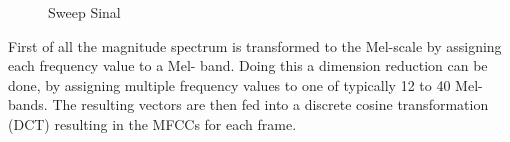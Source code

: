 \begin{figure}[htbp]
	\centering
	\caption{Sweep Sinal}	
	\label{sweep}
\end{figure}
\FloatBarrier

First of all the magnitude spectrum is transformed to the Mel-scale by assigning each frequency value to a Mel- band.
Doing this a dimension reduction can be done, by assigning multiple frequency values to one of typically 12 to 40 Mel-bands. The resulting vectors are then fed into a discrete cosine transformation (DCT) resulting in the MFCCs for each frame. 

